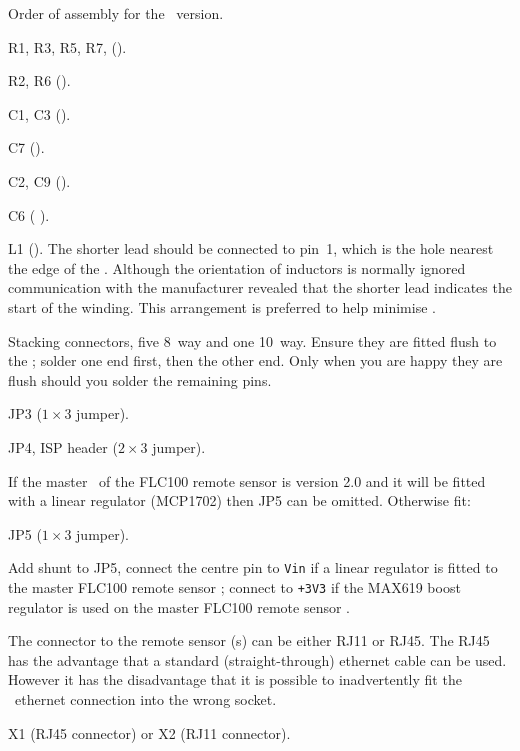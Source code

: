   Order of assembly
for the \PoE\ version.
\begin{buildorder}
\item R1, R3, R5, R7, ().
\item R2, R6 ().
\item C1, C3 ().
\item C7 ().
\item C2, C9 ().
\item C6 ( ).
\item L1 (). The shorter lead should be connected to pin~1,
  which is the hole nearest the edge of the \pcb. Although the
  orientation of inductors is normally ignored communication with the
  manufacturer revealed that the shorter lead indicates the start of
  the winding. This arrangement is preferred to help minimise \rfi.
\item Stacking connectors, five 8~way and one 10~way. Ensure they are
  fitted flush to the \pcb; solder one end first, then the other
  end. Only when you are happy they are flush should you solder the
  remaining pins.
\item JP3 ($1 \times 3$ jumper).
\item JP4, ISP header ($2 \times 3$ jumper).
\end{buildorder}

If the master \pcb\ of the FLC100 remote sensor is version 2.0 and it
will be fitted with a linear regulator (MCP1702) then JP5 can be
omitted. Otherwise fit:
\begin{buildorder*}
\item JP5 ($1 \times 3$ jumper).
\item Add shunt to JP5, connect the centre pin to \texttt{Vin} if a
  linear regulator is fitted to the master FLC100 remote sensor \pcb;
  connect to \texttt{+3V3} if the MAX619 boost regulator is used on
  the master FLC100 remote sensor \pcb.
\end{buildorder*}


The connector to the remote sensor \pcb{}(s) can be either RJ11 or
RJ45. The RJ45 has the advantage that a standard (straight-through)
ethernet cable can be used. However it has the disadvantage that it is
possible to inadvertently fit the \PoE\ ethernet connection into the
wrong socket.
\begin{buildorder*}
\item X1 (RJ45 connector) or X2 (RJ11 connector). 
\end{buildorder*}

